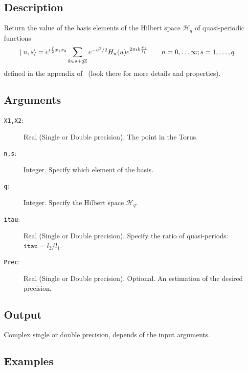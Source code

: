 \subsection{Description}

Return the value of the basis elements of the Hilbert space $\mathcal
H_q$ of quasi-periodic functions
\begin{equation}
  \mid n,s \rangle = e^{\imath
    \frac{f}{2}x_1x_2} \sum_{k\in s + q\mathbb Z} 
  e^{-u^2/2}H_n(u)
  e^{2\pi\imath k\frac{x_1}{l_1}}\qquad n=0,\dots\infty;s=1,\dots,q
\end{equation}
defined in the appendix of~\cite{Gonzalez-Arroyo:2004xu} (look there
for more details and properties).

\subsection{Arguments}

\begin{description}
\item[\texttt{X1,X2}:] Real (Single or Double precision). The point in
  the Torus.
\item[\texttt{n,s}:] Integer. Specify which element of the basis.
\item[\texttt{q}:] Integer. Specify the Hilbert space $\mathcal H_q$.
\item[\texttt{itau}:] Real (Single or Double precision). Specify the
  ratio of quasi-periods: $\mathtt{itau} = l_2/l_1$.
\item[\texttt{Prec}:] Real (Single or Double precision). Optional. An
  estimation of the desired precision. 
\end{description}

\subsection{Output}

Complex single or double precision, depends of the input  arguments.

\subsection{Examples}

